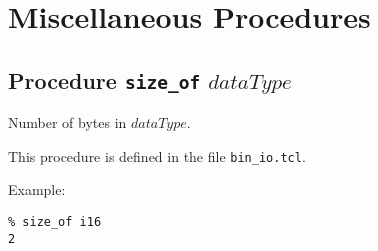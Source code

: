 
\section{Miscellaneous Procedures}
    \label{Miscellaneous-Procedures}

\subsection{Procedure \texttt{size\_of} $\mathit{dataType}$}
    \label{size-of}

Number of bytes in $\mathit{dataType}$.

This procedure is defined in the file \texttt{bin\_io.tcl}.

Example:
\begin{verbatim}
% size_of i16
2
\end{verbatim}

